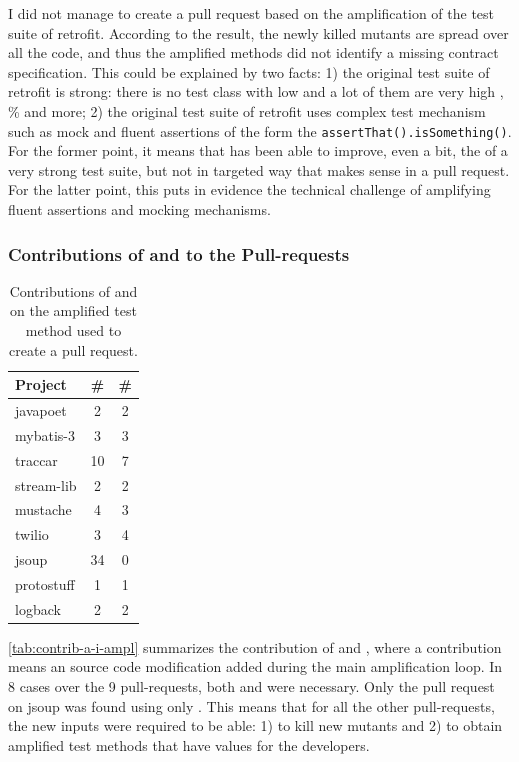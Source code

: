 I did not manage to create a pull request based on the amplification of the test suite of retrofit. 
According to the result, the newly killed mutants are spread over all the code, and thus the amplified methods did not identify a missing contract specification. 
This could be explained by two facts: 
1) the original test suite of retrofit is strong: there is no test class with low \ms and a lot of them are very high \ms, \% and more;
2) the original test suite of retrofit uses complex test mechanism such as mock and fluent assertions of the form the \texttt{assertThat().isSomething()}. 
For the former point, it means that \dspot has been able to improve, even a bit, the \ms of a very strong test suite, but not in targeted way that makes sense in a pull request.
For the latter point, this puts in evidence the technical challenge of amplifying fluent assertions and mocking mechanisms.

\subsubsection{Contributions of \Aampl and \Iampl to the Pull-requests}

\begin{table}[]
	\caption{Contributions of \Aampl and \Iampl on the amplified test method used to create a pull request.}
	\label{tab:contrib-a-i-ampl}
	\centering\begin{tabular}{lcc}
		\hline
		Project & \#\Aampl &  \#\Iampl \\
		\hline
		javapoet & 2 & 2 \\
		mybatis-3 & 3 & 3 \\
		traccar & 10 & 7 \\
		stream-lib & 2 & 2 \\
		mustache & 4 & 3 \\
		twilio & 3 & 4 \\
		jsoup & 34 & 0 \\
		protostuff & 1 & 1 \\
		logback & 2 & 2 \\
		\hline
	\end{tabular}
\end{table}

\autoref{tab:contrib-a-i-ampl} summarizes the contribution of \Aampl and \Iampl, where a contribution means an source code modification added during the main amplification loop. 
In 8 cases over the 9 pull-requests, both \Aampl and \Iampl were necessary. 
Only the pull request on jsoup was found using only \Aampl. 
This means that for all the other pull-requests, the new inputs were required to be able: 
1) to kill new mutants and 
2) to obtain amplified test methods that have values for the developers.

